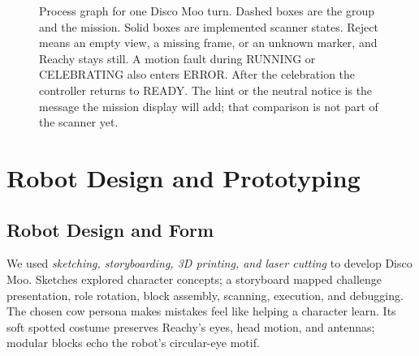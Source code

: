 \documentclass[conference,12pt,letterpaper]{IEEEtran}
\begin{document}
\begin{figure}[H]
{%
}%
\ifdim\wd0>\linewidth
  \resizebox{\linewidth}{!}{\box0}%
\else
  \box0
\fi
\caption{Process graph for one Disco Moo turn. Dashed boxes are the group and the mission. Solid boxes are implemented scanner states. Reject means an empty view, a missing frame, or an unknown marker, and Reachy stays still. A motion fault during RUNNING or CELEBRATING also enters ERROR. After the celebration the controller returns to READY. The hint or the neutral notice is the message the mission display will add; that comparison is not part of the scanner yet.}
\label{fig:architecture}
\end{figure}

\section{Robot Design and Prototyping}

\subsection{Robot Design and Form}

We used \emph{sketching, storyboarding, 3D printing, and laser cutting} to develop Disco Moo. Sketches explored character concepts; a storyboard mapped challenge presentation, role rotation, block assembly, scanning, execution, and debugging. The chosen cow persona makes mistakes feel like helping a character learn. Its soft spotted costume preserves Reachy's eyes, head motion, and antennas; modular blocks echo the robot's circular-eye motif.
\end{document}
